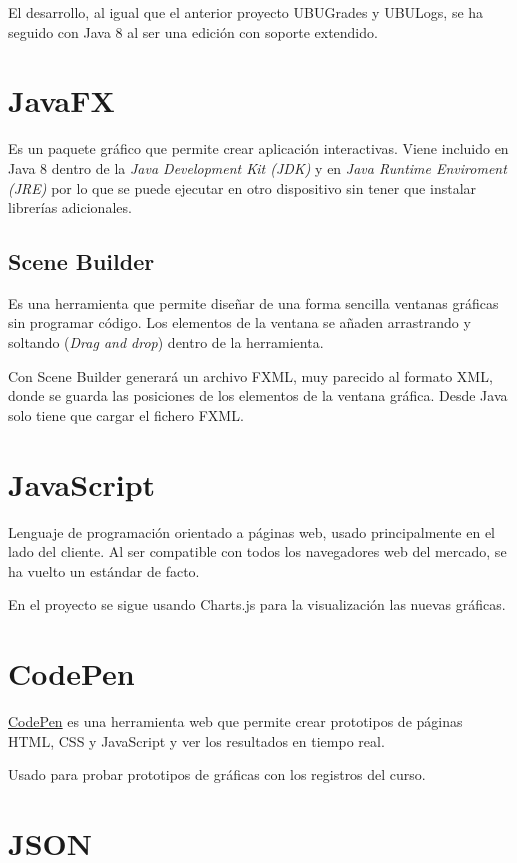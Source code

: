 El desarrollo, al igual que el anterior proyecto UBUGrades y UBULogs, se ha seguido con Java 8 al ser una edición con soporte extendido\cite{noauthor_oracle_nodate}.

\section{JavaFX}
Es un paquete gráfico que permite crear aplicación interactivas. Viene incluido en Java 8 dentro de la \textit{Java Development Kit (JDK)} y en \textit{Java Runtime Enviroment (JRE)} por lo que se puede ejecutar en otro dispositivo sin tener que instalar librerías adicionales.

\subsection{Scene Builder}
Es una herramienta que permite diseñar de una forma sencilla ventanas gráficas sin programar código. Los elementos de la ventana se añaden arrastrando y soltando (\textit{Drag and drop}) dentro de la herramienta.


Con Scene Builder generará un archivo FXML, muy parecido al formato XML, donde se guarda las posiciones de los elementos de la ventana gráfica. Desde Java solo tiene que cargar el fichero FXML.

\section{JavaScript}
Lenguaje de programación orientado a páginas web, usado principalmente en el lado del cliente. Al ser compatible con todos los navegadores web del mercado, se ha vuelto un estándar de facto.

En el proyecto se sigue usando Charts.js para la visualización las nuevas gráficas.

\section{CodePen}
\href{https://codepen.io}{CodePen} es una herramienta web que permite crear prototipos de páginas HTML, CSS y JavaScript y ver los resultados en tiempo real.

Usado para probar prototipos de gráficas con los registros del curso.

\section{JSON}

